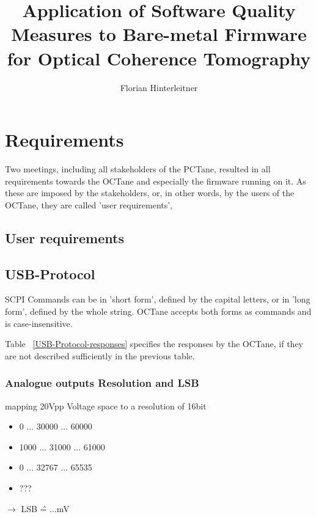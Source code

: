 \documentclass[master,english,smartquotes,apa]{hgbthesis}
\title{ Application of Software Quality Measures to Bare-metal Firmware for Optical Coherence Tomography}
\author{Florian Hinterleitner}
\begin{document}
\frontmatter                                   %
\maketitle

\tableofcontents

		
			
\mainmatter                                    %


% 

	
	\chapter{Requirements}
	\label{cha:Requirements}
		Two meetings, including all stakeholders of the PCTane, resulted in all requirements towards the OCTane and especially the firmware running on it. As these are imposed by the stakeholders, or, in other words, by the users of the OCTane, they are called 'user requirements',
			\section{User requirements}
				
		\pagebreak
			\section{USB-Protocol}
		SCPI Commands can be in 'short form', defined by the capital letters, or in 'long form', defined by the whole string. OCTane accepts both forms as commands and is case-insensitive.

			{	\scriptsize
				
			}
			Table ~\ref{USB-Protocol-responses} specifies the responses by the OCTane, if they are not described sufficiently in the previous table.

			{	\scriptsize
				
			}
			
	\subsection{Analogue outputs Resolution and LSB}
	mapping 20Vpp Voltage space to a resolution of 16bit
	\begin{itemize}
		\item 0 ... 30000 ... 60000
		\item 1000 ... 31000 ... 61000
		\item 0 ... 32767 ... 65535
		\item ???
	\end{itemize}
	$\rightarrow$ LSB \^{=} ...mV
\end{document}
